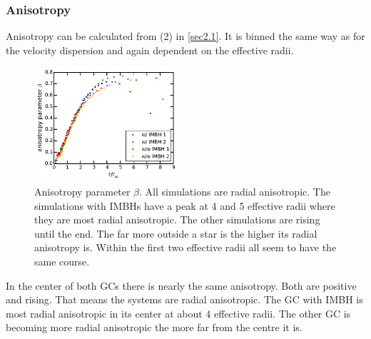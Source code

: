\subsubsection{Anisotropy}
Anisotropy can be calculated from (2) in \ref{sec2.1}. It is binned the same way as for the velocity dispersion and again dependent on the effective radii.
\begin{figure}[htbp]
	\centering
	\includegraphics[width=0.475\textwidth]{Plots/anisotropy_parameter_beta.pdf}
	\caption{Anisotropy parameter \(\beta\). All simulations are radial anisotropic. The simulations with \acp{IMBH} have a peak at 4 and 5 effective radii where they are most radial anisotropic. The other simulations are rising until the end. The far more outside a star is the higher its radial anisotropy is. Within the first two effective radii all seem to have the same course.}
	\label{fig:anisotropy_param}
\end{figure}
In the center of both \acp{GC} there is nearly the same anisotropy. Both are positive and rising. That means the systems are radial anisotropic. The \ac{GC} with \ac{IMBH} is most radial anisotropic in its center at about 4 effective radii. The other \ac{GC} is becoming more radial anisotropic the more far from the centre it is.

